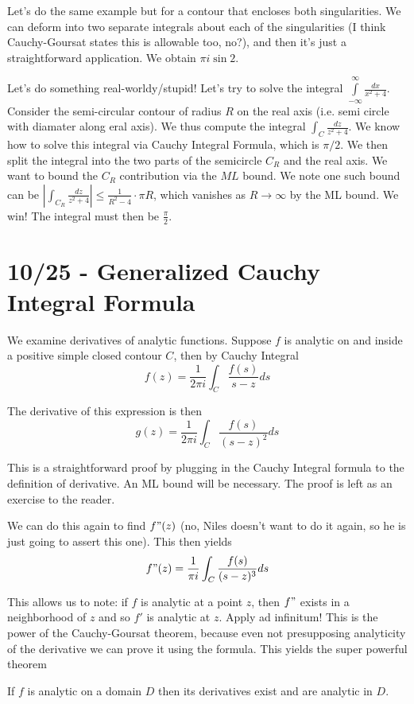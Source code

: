 \documentclass[10pt]{report}
\newcommand{\abs}[1]{\left|#1\right|}
\begin{document}
Let's do the same example but for a contour that encloses both singularities. We can deform into two separate integrals about each of the singularities (I think Cauchy-Goursat states this is allowable too, no?), and then it's just a straightforward application. We obtain $\pi i \sin 2$. 

Let's do something real-worldy/stupid! Let's try to solve the integral $\displaystyle\int\limits_{-\infty}^{\infty}\frac{dx}{x^2+4}$. Consider the semi-circular contour of radius $R$ on the real axis (i.e. semi circle with diamater along eral axis). We thus compute the integral $\int_C \frac{dz}{z^2+4}$. We know how to solve this integral via Cauchy Integral Formula, which is $\pi/2$. We then split the integral into the two parts of the semicircle $C_R$ and the real axis. We want to bound the $C_R$ contribution via the $ML$ bound. We note one such bound can be $\abs{\int_{C_R} \frac{dz}{z^2+4}} \leq \frac{1}{R^2-4} \cdot \pi R$, which vanishes as $R \to\infty$ by the ML bound. We win! The integral must then be $\frac{\pi}{2}$. 

\chapter{10/25 - Generalized Cauchy Integral Formula}

We examine derivatives of analytic functions. Suppose $f$ is analytic on and inside a positive simple closed contour $C$, then by Cauchy Integral
$$f(z) = \frac{1}{2\pi i}\int_C \frac{f(s)}{s-z}ds$$

The derivative of this expression is then
$$g(z) = \frac{1}{2\pi i} \int_C \frac{f(s)}{(s-z)^2}ds$$

This is a straightforward proof by plugging in the Cauchy Integral formula to the definition of derivative. An ML bound will be necessary. The proof is left as an exercise to the reader.

We can do this again to find $f"(z)$ (no, Niles doesn't want to do it again, so he is just going to assert this one). This then yields
$$f"(z) = \frac{1}{\pi i} \int_C \frac{f(s)}{(s-z)^3} ds$$

This allows us to note: if $f$ is analytic at a point $z$, then $f"$ exists in a neighborhood of $z$ and so $f'$ is analytic at $z$. Apply ad infinitum! This is the power of the Cauchy-Goursat theorem, because even not presupposing analyticity of the derivative we can prove it using the formula. This yields the super powerful theorem
\begin{center}
	If $f$ is analytic on a domain $D$ then its derivatives exist and are analytic in $D$. 
\end{center}
\end{document}
